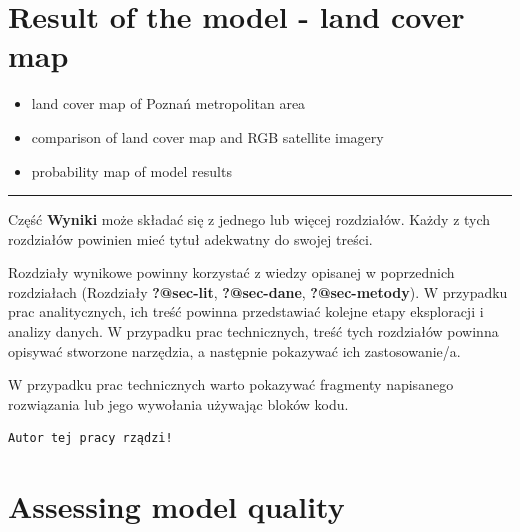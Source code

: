 \documentclass{amuthesis}
\begin{document}

\hypertarget{sec-results-map}{%
\chapter{Result of the model - land cover map}\label{sec-results-map}}

\begin{itemize}
\item
  land cover map of Poznań metropolitan area
\item
  comparison of land cover map and RGB satellite imagery
\item
  probability map of model results
\end{itemize}

\begin{center}\rule{0.5\linewidth}{0.5pt}\end{center}

Część \textbf{Wyniki} może składać się z jednego lub więcej rozdziałów.
Każdy z tych rozdziałów powinien mieć tytuł adekwatny do swojej treści.

Rozdziały wynikowe powinny korzystać z wiedzy opisanej w poprzednich
rozdziałach (Rozdziały \textbf{?@sec-lit}, \textbf{?@sec-dane},
\textbf{?@sec-metody}). W przypadku prac analitycznych, ich treść
powinna przedstawiać kolejne etapy eksploracji i analizy danych. W
przypadku prac technicznych, treść tych rozdziałów powinna opisywać
stworzone narzędzia, a następnie pokazywać ich zastosowanie/a.

W przypadku prac technicznych warto pokazywać fragmenty napisanego
rozwiązania lub jego wywołania używając bloków kodu.

\begin{Shaded}
\begin{Highlighting}[]
\OtherTok{=} 
  \NormalTok{)}
\NormalTok{\}}
\NormalTok{(}\NormalTok{)}
\end{Highlighting}
\end{Shaded}

\begin{verbatim}
Autor tej pracy rządzi!
\end{verbatim}


\hypertarget{sec-results-eval}{%
\chapter{Assessing model quality}\label{sec-results-eval}}
\end{document}
